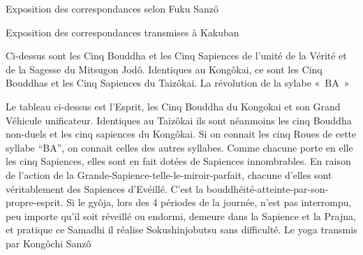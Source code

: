 Exposition des correspondances selon Fuku Sanzô


Exposition des correspondances transmises à Kakuban


Ci-dessus sont les Cinq Bouddha et les Cinq Sapiences de l'unité de la Vérité et de la Sagesse du Mitsugon Jodô. Identiques au Kongôkai,  ce sont les  Cinq Bouddhas et les  Cinq Sapiences du Taizôkai.
La révolution de la sylabe « BA »


Le tableau ci-dessus est l’Esprit, les Cinq Bouddha du Kongokai et son Grand Véhicule unificateur. Identiques au Taizôkai ils sont néanmoins les cinq Bouddha non-duels et les cinq sapiences du Kongôkai.
Si on connait les cinq Roues de cette syllabe “BA”, on connait celles des autres syllabes. Comme chacune porte en elle les cinq Sapiences, elles sont en fait dotées de Sapiences innombrables. En raison de l'action de la Grande-Sapience-telle-le-miroir-parfait, chacune d'elles sont véritablement des Sapiences d'Evéillé. C’est la bouddhéité-atteinte-par-son-propre-esprit.
Si le gyôja, lors des 4 périodes de la journée, n’est pas interrompu, peu importe qu’il soit réveillé ou endormi, demeure dans la Sapience et la Prajna, et pratique ce Samadhi il réalise Sokushinjobutsu sans difficulté.
Le yoga transmis par Kongôchi Sanzô


